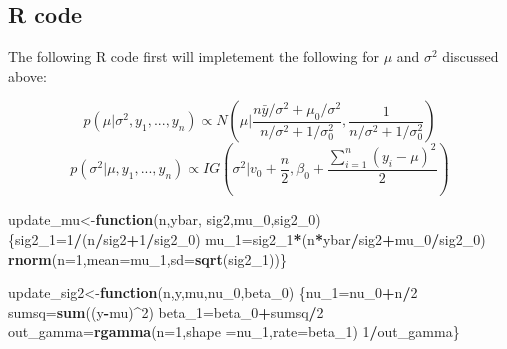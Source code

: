 \documentclass[]{book}
\newenvironment{Shaded}{\begin{snugshade}}{\end{snugshade}}
\newcommand{\KeywordTok}[1]{\textcolor[rgb]{0.13,0.29,0.53}{\textbf{#1}}}
\newcommand{\DataTypeTok}[1]{\textcolor[rgb]{0.13,0.29,0.53}{#1}}
\newcommand{\DecValTok}[1]{\textcolor[rgb]{0.00,0.00,0.81}{#1}}
\newcommand{\ControlFlowTok}[1]{\textcolor[rgb]{0.13,0.29,0.53}{\textbf{#1}}}
\newcommand{\OperatorTok}[1]{\textcolor[rgb]{0.81,0.36,0.00}{\textbf{#1}}}
\newcommand{\NormalTok}[1]{#1}
\begin{document}
\subsection{R code}\label{r-code-1}

The following R code first will impletement the following for \(\mu\)
and \(\sigma^2\) discussed above:

\[p(\mu| \sigma^2, y_1,...,y_n) \propto  N(\mu |\frac{n\bar{y}/\sigma^2+\mu_0/\sigma^2}{n/\sigma^2+1/\sigma_0^2},\frac{1}{n/\sigma^2+1/\sigma_0^2}) \]
\[ p(\sigma^2| \mu, y_1,...,y_n)  \propto IG(\sigma^2|v_0+\frac{n}{2},\beta_0+\frac{\sum_{i=1}^n(y_i-\mu)^2}{2})\]

\begin{Shaded}
\begin{Highlighting}[]
\NormalTok{update_mu<-}\ControlFlowTok{function}\NormalTok{(n,ybar, sig2,mu_}\DecValTok{0}\NormalTok{,sig2_}\DecValTok{0}\NormalTok{)}
\NormalTok{          \{sig2_}\DecValTok{1}\NormalTok{=}\DecValTok{1}\OperatorTok{/}\NormalTok{(n}\OperatorTok{/}\NormalTok{sig2}\OperatorTok{+}\DecValTok{1}\OperatorTok{/}\NormalTok{sig2_}\DecValTok{0}\NormalTok{)}
\NormalTok{           mu_}\DecValTok{1}\NormalTok{=sig2_}\DecValTok{1}\OperatorTok{*}\NormalTok{(n}\OperatorTok{*}\NormalTok{ybar}\OperatorTok{/}\NormalTok{sig2}\OperatorTok{+}\NormalTok{mu_}\DecValTok{0}\OperatorTok{/}\NormalTok{sig2_}\DecValTok{0}\NormalTok{)}
           \KeywordTok{rnorm}\NormalTok{(}\DataTypeTok{n=}\DecValTok{1}\NormalTok{,}\DataTypeTok{mean=}\NormalTok{mu_}\DecValTok{1}\NormalTok{,}\DataTypeTok{sd=}\KeywordTok{sqrt}\NormalTok{(sig2_}\DecValTok{1}\NormalTok{))\}}



\NormalTok{update_sig2<-}\ControlFlowTok{function}\NormalTok{(n,y,mu,nu_}\DecValTok{0}\NormalTok{,beta_}\DecValTok{0}\NormalTok{)}
\NormalTok{         \{nu_}\DecValTok{1}\NormalTok{=nu_}\DecValTok{0}\OperatorTok{+}\NormalTok{n}\OperatorTok{/}\DecValTok{2}
\NormalTok{         sumsq=}\KeywordTok{sum}\NormalTok{((y}\OperatorTok{-}\NormalTok{mu)}\OperatorTok{^}\DecValTok{2}\NormalTok{)}
\NormalTok{         beta_}\DecValTok{1}\NormalTok{=beta_}\DecValTok{0}\OperatorTok{+}\NormalTok{sumsq}\OperatorTok{/}\DecValTok{2}
\NormalTok{         out_gamma=}\KeywordTok{rgamma}\NormalTok{(}\DataTypeTok{n=}\DecValTok{1}\NormalTok{,}\DataTypeTok{shape =}\NormalTok{nu_}\DecValTok{1}\NormalTok{,}\DataTypeTok{rate=}\NormalTok{beta_}\DecValTok{1}\NormalTok{)}
         \DecValTok{1}\OperatorTok{/}\NormalTok{out_gamma\}}




\end{Highlighting}
\end{Shaded}
\end{document}
